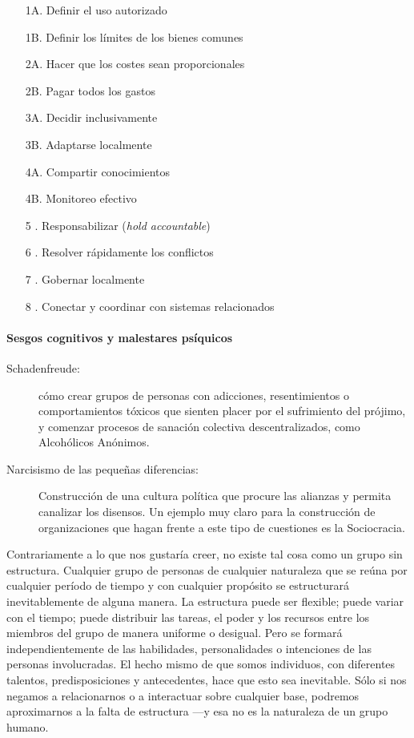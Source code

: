 \begin{enumerate}
  \item[1A.] Definir el uso autorizado
  \item[1B.] Definir los límites de los bienes comunes
  \item[2A.] Hacer que los costes sean proporcionales
  \item[2B.] Pagar todos los gastos
  \item[3A.] Decidir inclusivamente
  \item[3B.] Adaptarse localmente
  \item[4A.] Compartir conocimientos
  \item[4B.] Monitoreo efectivo
  \item[5 .] Responsabilizar (\emph{hold accountable})
  \item[6 .] Resolver rápidamente los conflictos
  \item[7 .] Gobernar localmente
  \item[8 .] Conectar y coordinar con sistemas relacionados
\end{enumerate}

\paragraph{Sesgos cognitivos y malestares psíquicos}
\label{par:sesgos-cognitivos-y-malestares-psíquicos}

\begin{description}
  \item[Schadenfreude:] cómo crear grupos de personas con adicciones, resentimientos o comportamientos tóxicos que sienten placer por el sufrimiento del prójimo, y comenzar procesos de sanación colectiva descentralizados, como Alcohólicos Anónimos.
  \item[Narcisismo de las pequeñas diferencias:] Construcción de una cultura política que procure las alianzas y permita canalizar los disensos. Un ejemplo muy claro para la construcción de organizaciones que hagan frente a este tipo de cuestiones es la Sociocracia.
\end{description}

Contrariamente a lo que nos gustaría creer, no existe tal cosa como un grupo sin estructura. Cualquier grupo de personas de cualquier naturaleza que se reúna por cualquier período de tiempo y con cualquier propósito se estructurará inevitablemente de alguna manera. La estructura puede ser flexible; puede variar con el tiempo; puede distribuir las tareas, el poder y los recursos entre los miembros del grupo de manera uniforme o desigual. Pero se formará independientemente de las habilidades, personalidades o intenciones de las personas involucradas. El hecho mismo de que somos individuos, con diferentes talentos, predisposiciones y antecedentes, hace que esto sea inevitable. Sólo si nos negamos a relacionarnos o a interactuar sobre cualquier base, podremos aproximarnos a la falta de estructura ---y esa no es la naturaleza de un grupo humano.

